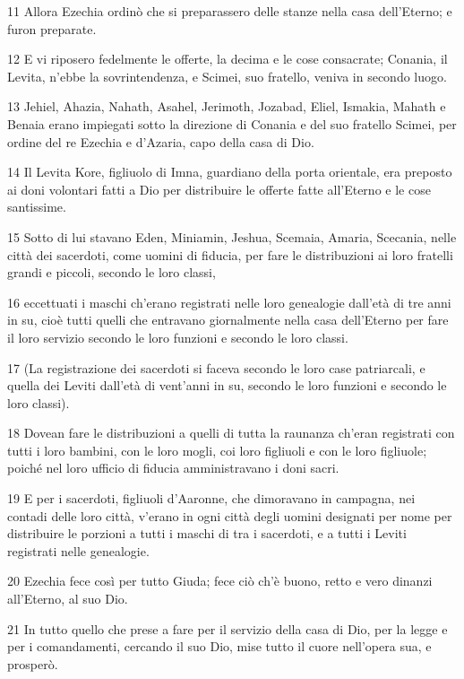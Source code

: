 \par 11 Allora Ezechia ordinò che si preparassero delle stanze nella casa dell'Eterno; e furon preparate.
\par 12 E vi riposero fedelmente le offerte, la decima e le cose consacrate; Conania, il Levita, n'ebbe la sovrintendenza, e Scimei, suo fratello, veniva in secondo luogo.
\par 13 Jehiel, Ahazia, Nahath, Asahel, Jerimoth, Jozabad, Eliel, Ismakia, Mahath e Benaia erano impiegati sotto la direzione di Conania e del suo fratello Scimei, per ordine del re Ezechia e d'Azaria, capo della casa di Dio.
\par 14 Il Levita Kore, figliuolo di Imna, guardiano della porta orientale, era preposto ai doni volontari fatti a Dio per distribuire le offerte fatte all'Eterno e le cose santissime.
\par 15 Sotto di lui stavano Eden, Miniamin, Jeshua, Scemaia, Amaria, Scecania, nelle città dei sacerdoti, come uomini di fiducia, per fare le distribuzioni ai loro fratelli grandi e piccoli, secondo le loro classi,
\par 16 eccettuati i maschi ch'erano registrati nelle loro genealogie dall'età di tre anni in su, cioè tutti quelli che entravano giornalmente nella casa dell'Eterno per fare il loro servizio secondo le loro funzioni e secondo le loro classi.
\par 17 (La registrazione dei sacerdoti si faceva secondo le loro case patriarcali, e quella dei Leviti dall'età di vent'anni in su, secondo le loro funzioni e secondo le loro classi).
\par 18 Dovean fare le distribuzioni a quelli di tutta la raunanza ch'eran registrati con tutti i loro bambini, con le loro mogli, coi loro figliuoli e con le loro figliuole; poiché nel loro ufficio di fiducia amministravano i doni sacri.
\par 19 E per i sacerdoti, figliuoli d'Aaronne, che dimoravano in campagna, nei contadi delle loro città, v'erano in ogni città degli uomini designati per nome per distribuire le porzioni a tutti i maschi di tra i sacerdoti, e a tutti i Leviti registrati nelle genealogie.
\par 20 Ezechia fece così per tutto Giuda; fece ciò ch'è buono, retto e vero dinanzi all'Eterno, al suo Dio.
\par 21 In tutto quello che prese a fare per il servizio della casa di Dio, per la legge e per i comandamenti, cercando il suo Dio, mise tutto il cuore nell'opera sua, e prosperò.

